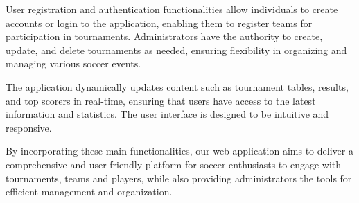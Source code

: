 \noindent User registration and authentication functionalities allow individuals to create accounts or login to the application, enabling them to register teams for participation in tournaments. Administrators have the authority to create, update, and delete tournaments as needed, ensuring flexibility in organizing and managing various soccer events.

\noindent The application dynamically updates content such as tournament tables, results, and top scorers in real-time, ensuring that users have access to the latest information and statistics. The user interface is designed to be intuitive and responsive.

\noindent By incorporating these main functionalities, our web application aims to deliver a comprehensive and user-friendly platform for soccer enthusiasts to engage with tournaments, teams and players, while also providing administrators the tools for efficient management and organization.
\newpage